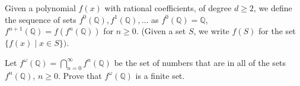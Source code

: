 Given a polynomial $f(x)$ with rational coefficients, of degree $d \ge 2$, we define the sequence of sets $f^0(\mathbb{Q}), f^1(\mathbb{Q}), \ldots$ as $f^0(\mathbb{Q})=\mathbb{Q}$, $f^{n+1}(\mathbb{Q})=f(f^{n}(\mathbb{Q}))$ for $n\ge 0$. (Given a set $S$, we write $f(S)$ for the set $\{f(x)\mid x\in S\})$.

Let $f^{\omega}(\mathbb{Q})=\bigcap_{n=0}^{\infty} f^n(\mathbb{Q})$ be the set of numbers that are in all of the sets $f^n(\mathbb{Q})$, $n\geq 0$. Prove that $f^{\omega}(\mathbb{Q})$ is a finite set.